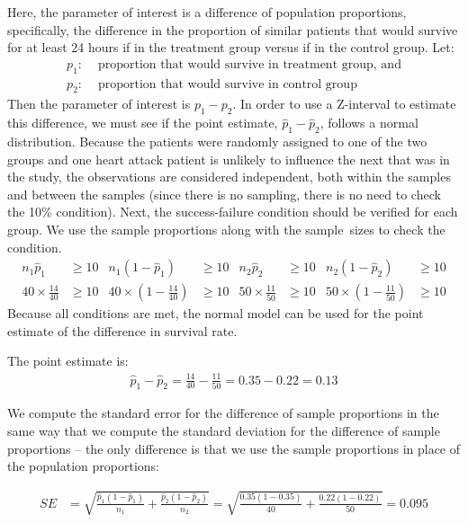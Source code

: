 Here, the parameter of interest is a difference of population proportions, specifically, the difference in the proportion of similar patients that would survive for at least 24 hours if in the treatment group versus if in the control group.  Let:
\begin{align*}
p_1:& \text{ proportion that would survive in treatment group, and} \\
p_2:& \text{ proportion that would survive in control group}
\end{align*}
Then the parameter of interest is $p_1 - p_2$.  In order to use a Z-interval to estimate this difference, we must see if the point estimate, $\hat{p}_{1} - \hat{p}_{2}$, follows a normal distribution.  Because the patients were randomly assigned to one of the two groups and one heart attack patient is unlikely to influence the next that was in the study, the observations are considered independent, both within the samples and between the samples (since there is no sampling, there is no need to check the 10\% condition).  Next, the success-failure condition should be verified for each group.  We use the sample proportions along with the sample~sizes to check the condition.
\begin{align*}
n_1\hat{p}_1&\ge 10 & n_1(1-\hat{p}_1)&\ge 10 & n_2\hat{p}_2&\ge 10 & n_2(1-\hat{p}_2)&\ge 10 \\
40 \times \frac{14}{40} &\ge 10
	&40 \times (1-\frac{14}{40}) &\ge 10
	&50 \times \frac{11}{50} &\ge 10
	&50 \times (1-\frac{11}{50}) &\ge 10
\end{align*}
Because all conditions are met, the normal model can be used for the point estimate of the difference in survival rate.

The point estimate is:
  \begin{align*}
  \hat{p}_{1} - \hat{p}_{2}
    = \frac{14}{40} - \frac{11}{50}
    = 0.35 - 0.22
    = 0.13
  \end{align*}

\D{\newpage}

We compute the standard error for the difference of sample proportions in the same way that we compute the standard deviation for the difference of sample proportions --  the only difference is that we use the sample proportions in place of the population proportions:

\begin{align*}
SE &= \sqrt{\frac{\hat{p}_1(1-\hat{p}_1)}{n_1} + \frac{\hat{p}_2(1-\hat{p}_2)}{n_2}}= \sqrt{\frac{0.35 (1 - 0.35)}{40} +
      \frac{0.22 (1 - 0.22)}{50}}
    = 0.095
  \end{align*}

